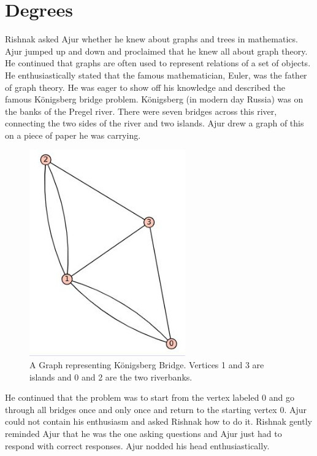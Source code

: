 \chapter{Degrees}
Rishnak asked Ajur whether he knew about graphs and trees in mathematics. Ajur jumped up and down and proclaimed that he knew all about graph theory. He continued that graphs are often used to  represent relations of a set of objects. He enthusiastically stated that the famous mathematician, Euler, was the father of graph theory. He was eager to show off his knowledge and described the famous  K\"{o}nigsberg bridge problem.  K\"{o}nigsberg (in modern day Russia) was on the banks of the Pregel river.  There were seven bridges across this river, connecting the two sides of the river and two islands. Ajur drew a graph of this on a piece of paper he was carrying.
\begin{figure}
\begin{center}
\includegraphics[width=0.6\textwidth]{konigsberg.JPG}
\caption{A Graph representing K\"{o}nigsberg Bridge. Vertices 1 and 3 are islands and 0 and 2 are the two riverbanks.}\label{kon}
\end{center}
\end{figure}

He continued that the problem was to start from the vertex labeled 0 and go through all bridges once and only once and return to the starting vertex 0. Ajur could not contain his enthusiasm and asked Rishnak how to do it. Rishnak gently reminded Ajur that he was the one asking questions and Ajur just had to respond with correct responses. Ajur nodded his head enthusiastically.

